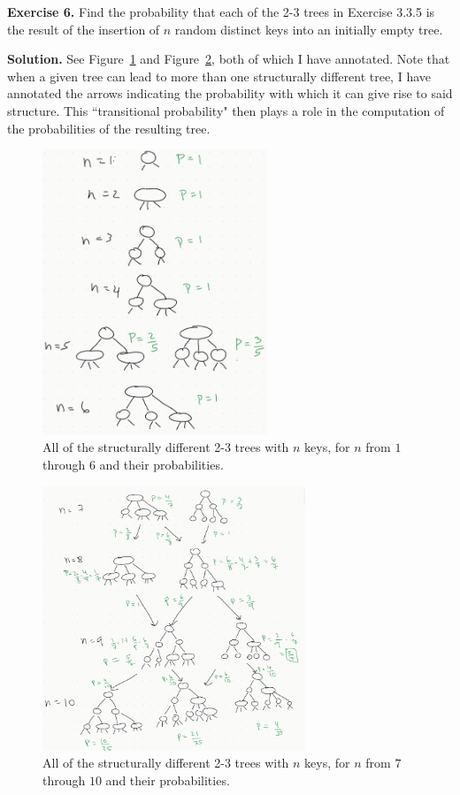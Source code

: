 \documentclass[12pt, a4paper]{article}
\newenvironment{ex}[2][Exercise]
{\par\medskip\noindent \textbf{#1 #2.}}
{\medskip}
\newenvironment{sol}[1][Solution]
{\par\medskip\noindent \textbf{#1.} }
{\medskip}
\begin{document}
	\begin{ex}{6}
		Find the probability that each of the 2-3 trees in Exercise 3.3.5 is the result
		of the insertion of $n$ random distinct keys into an initially empty tree.
	\end{ex}
	\begin{sol}
		See Figure~\ref{fig:ex-06-1} and Figure~\ref{fig:ex-06-2}, both of which I
		have annotated. Note that when a given tree can lead to more than one structurally
		different tree, I have annotated the arrows indicating the probability with
		which it can give rise to said structure. This ``transitional probability"
		then plays a role in the computation of the probabilities of the resulting tree.
		\begin{figure}
			\centering
			\includegraphics[width=0.6\textwidth]{exercise-06-1}
			\caption{All of the structurally different 2-3 trees with $n$ keys, for
				$n$ from $1$ through $6$ and their probabilities.}
			\label{fig:ex-06-1}
		\end{figure}
		\begin{figure}
			\centering
			\includegraphics[width=0.7\textwidth]{exercise-06-2}
			\caption{All of the structurally different 2-3 trees with $n$ keys, for
				$n$ from $7$ through $10$ and their probabilities.}
			\label{fig:ex-06-2}
		\end{figure}
	\end{sol}
\end{document}
